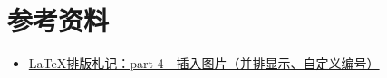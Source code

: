 \documentclass[
	draftmark = false,   %
	fontsetup = font-setup-open.tex,
	titlesetup = titles-setup.tex
]{AJbook}
\numberwithin{equation}{section}
\begin{document}
	\section{参考资料}
	\begin{itemize}
		\item \href{https://zhuanlan.zhihu.com/p/32925549}{LaTeX排版札记：part 4—插入图片（并排显示、自定义编号）}
	\end{itemize}
	
	\backmatter
	\printbibliography[heading=bibintoc]
	
	\listoffigures
	\listoftables

	{\footnotesize
	\printindex}
\end{document}
